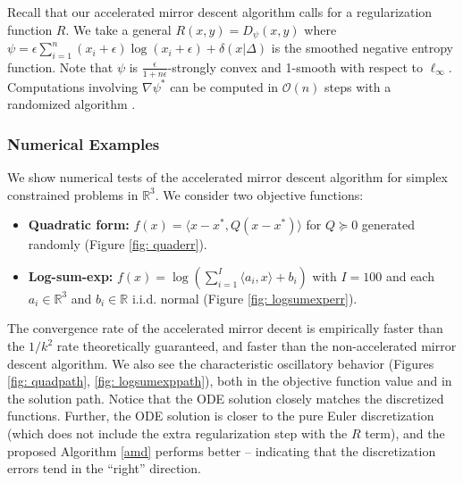 Recall that our accelerated mirror descent algorithm calls for a regularization function $R$. We take a general $R(x,y) = D_\psi(x,y)$ where $\psi = \epsilon \sum_{i=1}^n (x_i + \epsilon) \log (x_i + \epsilon) + \delta(x|\Delta)$ is the smoothed negative entropy function. Note that $\psi$ is $\frac{\epsilon}{1+n\epsilon}$-strongly convex and 1-smooth with respect to $\ell_\infty$. Computations involving $\nabla\psi^*$ can be computed in $\mathcal{O}(n)$ steps with a randomized algorithm  \citep{krichene2015efficient}. 

\subsubsection{Numerical Examples}

We show numerical tests of the accelerated mirror descent algorithm for simplex constrained problems in $\mathbb{R}^3$. We consider two objective functions:
\begin{itemize}
    \item \textbf{Quadratic form:} $f(x) = \langle x-x^*, Q(x-x^*) \rangle$ for $Q\succeq 0$ generated randomly (Figure \ref{fig: quaderr}).
    \item \textbf{Log-sum-exp:} $f(x) = \log \left( \sum_{i=1}^I \langle a_i, x \rangle + b_i \right)$ with $I=100$ and each $a_i\in\mathbb{R}^3$ and $b_i\in\mathbb{R}$ i.i.d. normal (Figure \ref{fig: logsumexperr}).
\end{itemize}
The convergence rate of the accelerated mirror decent is empirically faster than the $1/k^2$ rate theoretically guaranteed, and faster than the non-accelerated mirror descent algorithm. We also see the characteristic oscillatory behavior (Figures \ref{fig: quadpath}, \ref{fig: logsumexppath}), both in the objective function value and in the solution path. Notice that the ODE solution closely matches the discretized functions. Further, the ODE solution is closer to the pure Euler discretization (which does not include the extra regularization step with the $R$ term), and the proposed Algorithm \ref{amd} performs better -- indicating that the discretization errors tend in the ``right'' direction.

